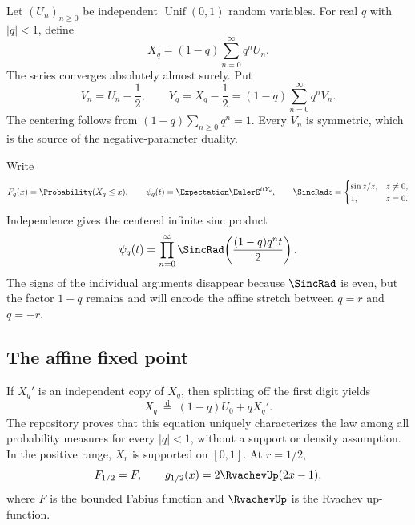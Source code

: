 \documentclass[11pt]{article}
\theoremstyle{definition}
\newcommand{\doteqL}{\mathrel{\stackrel{\mathrm d}=}}
\begin{document}
Let \((U_n)_{n\ge0}\) be independent \(\operatorname{Unif}(0,1)\) random variables.  For
real \(q\) with \(\lvert q\rvert<1\), define
\begin{equation}
 X_q=(1-q)\sum_{n=0}^{\infty}q^nU_n.                 \label{eq:Xq-def}
\end{equation}
The series converges absolutely almost surely.  Put
\begin{equation}
 V_n=U_n-\frac12,
 \qquad
 Y_q=X_q-\frac12=(1-q)\sum_{n=0}^{\infty}q^nV_n.     \label{eq:Yq-def}
\end{equation}
The centering follows from \((1-q)\sum_{n\ge0}q^n=1\).  Every \(V_n\) is symmetric,
which is the source of the negative-parameter duality.

Write
\[
 F_q(x)=\Probability(X_q\le x),
 \qquad
 \psi_q(t)=\Expectation \EulerE^{itY_q},
 \qquad
 \SincRad z=\begin{cases}\sin z/z,&z\ne0,\\1,&z=0.\end{cases}
\]
Independence gives the centered infinite sinc product
\begin{equation}
 \psi_q(t)=\prod_{n=0}^{\infty}
 \SincRad\!\left(\frac{(1-q)q^nt}{2}\right).             \label{eq:psi-product}
\end{equation}
The signs of the individual arguments disappear because \(\SincRad\) is even, but the
factor \(1-q\) remains and will encode the affine stretch between \(q=r\) and \(q=-r\).

\subsection{The affine fixed point}

If \(X_q'\) is an independent copy of \(X_q\), then splitting off the first digit yields
\begin{equation}
 X_q\ \doteqL\ (1-q)U_0+qX_q'.                       \label{eq:affine-fixed-point}
\end{equation}
The repository proves that this equation uniquely characterizes the law among all
probability measures for every \(\lvert q\rvert<1\), without a support or density
assumption.  In the positive range, \(X_r\) is supported on \([0,1]\).  At \(r=1/2\),
\begin{equation}
 F_{1/2}=F,
 \qquad
 g_{1/2}(x)=2\RvachevUp(2x-1),                                \label{eq:half-bridge}
\end{equation}
where \(F\) is the bounded Fabius function and \(\RvachevUp\) is the Rvachev up-function.
\end{document}
